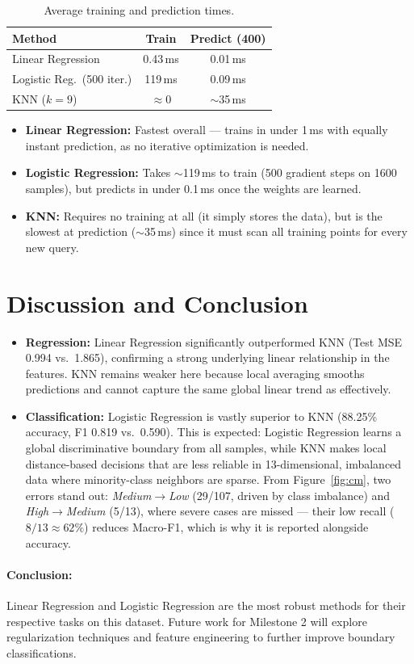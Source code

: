 \documentclass[10pt, twocolumn, letterpaper]{article}
\begin{document}
\begin{table}[H]
\centering
\caption{Average training and prediction times.}
\label{tab:runtime}
\setlength{\tabcolsep}{4pt}
\begin{tabular}{@{}lcc@{}}
\toprule
\textbf{Method} & \textbf{Train} & \textbf{Predict (400)} \\
\midrule
Linear Regression          & 0.43\,ms  & 0.01\,ms \\
Logistic Reg.\ (500 iter.) & 119\,ms   & 0.09\,ms \\
KNN ($k{=}9$)              & $\approx$0 & $\sim$35\,ms \\
\bottomrule
\end{tabular}
\end{table}

\begin{itemize}[noitemsep, leftmargin=*]
    \item \textbf{Linear Regression:} Fastest overall — trains in under 1\,ms with equally instant prediction, as no iterative optimization is needed.
    \item \textbf{Logistic Regression:} Takes $\sim$119\,ms to train (500 gradient steps on 1600 samples), but predicts in under 0.1\,ms once the weights are learned.
    \item \textbf{KNN:} Requires no training at all (it simply stores the data), but is the slowest at prediction ($\sim$35\,ms) since it must scan all training points for every new query.
\end{itemize}

\section{Discussion and Conclusion}
\begin{itemize}[leftmargin=*]
    \item \textbf{Regression:} Linear Regression significantly outperformed KNN (Test MSE 0.994 vs.\ 1.865), confirming a strong underlying linear relationship in the features. KNN remains weaker here because local averaging smooths predictions and cannot capture the same global linear trend as effectively.
    \item \textbf{Classification:} Logistic Regression is vastly superior to KNN (88.25\% accuracy, F1 0.819 vs.\ 0.590). This is expected: Logistic Regression learns a global discriminative boundary from all samples, while KNN makes local distance-based decisions that are less reliable in 13-dimensional, imbalanced data where minority-class neighbors are sparse. From Figure~\ref{fig:cm}, two errors stand out: \emph{Medium}$\to$\emph{Low} (29/107, driven by class imbalance) and \emph{High}$\to$\emph{Medium} (5/13), where severe cases are missed --- their low recall ($8/13 \approx 62\%$) reduces Macro-F1, which is why it is reported alongside accuracy.
\end{itemize}

\paragraph{Conclusion:} Linear Regression and Logistic Regression are the most robust methods for their respective tasks on this dataset. Future work for Milestone 2 will explore regularization techniques and feature engineering to further improve boundary classifications.
\end{document}

